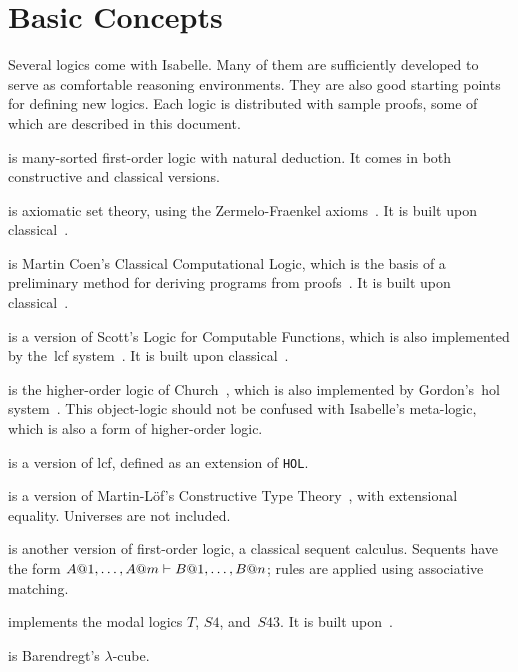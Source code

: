 \chapter{Basic Concepts}
Several logics come with Isabelle.  Many of them are sufficiently developed
to serve as comfortable reasoning environments.  They are also good
starting points for defining new logics.  Each logic is distributed with
sample proofs, some of which are described in this document.

\begin{ttdescription}
\item[\thydx{FOL}] is many-sorted first-order logic with natural
deduction.  It comes in both constructive and classical versions.

\item[\thydx{ZF}] is axiomatic set theory, using the Zermelo-Fraenkel
axioms~\cite{suppes72}.  It is built upon classical~\FOL{}.

\item[\thydx{CCL}] is Martin Coen's Classical Computational Logic,
  which is the basis of a preliminary method for deriving programs from
  proofs~\cite{coen92}.  It is built upon classical~\FOL{}.
 
\item[\thydx{LCF}] is a version of Scott's Logic for Computable
  Functions, which is also implemented by the~{\sc lcf}
  system~\cite{paulson87}.  It is built upon classical~\FOL{}.

\item[\thydx{HOL}] is the higher-order logic of Church~\cite{church40},
which is also implemented by Gordon's~{\sc hol} system~\cite{mgordon-hol}.
This object-logic should not be confused with Isabelle's meta-logic, which is
also a form of higher-order logic.

\item[\thydx{HOLCF}] is a version of {\sc lcf}, defined as an
  extension of {\tt HOL}\@.
 
\item[\thydx{CTT}] is a version of Martin-L\"of's Constructive Type
Theory~\cite{nordstrom90}, with extensional equality.  Universes are not
included.
 
\item[\thydx{LK}] is another version of first-order logic, a classical
sequent calculus.  Sequents have the form $A@1,\ldots,A@m\vdash
B@1,\ldots,B@n$; rules are applied using associative matching.

\item[\thydx{Modal}] implements the modal logics $T$, $S4$,
  and~$S43$.  It is built upon~\LK{}.

\item[\thydx{Cube}] is Barendregt's $\lambda$-cube.
\end{ttdescription}
